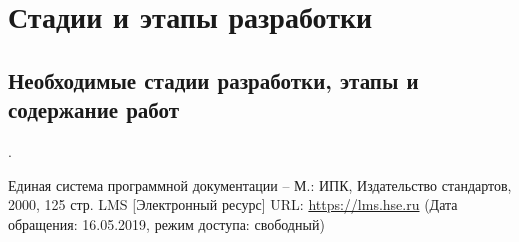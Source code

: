 \documentclass[a4paper,12pt,reqno]{article}
\begin{document}
						\newpage
	\section{Стадии и этапы разработки}
	
	\subsection{Необходимые стадии разработки, этапы и содержание работ}
	{\color{red}{TODO}}
	

						\newpage
	{\color{red}{TODO}}
						\newpage
	
	 \label{interface}
	{\color{red}{TODO}}.

						\newpage
	\begin{thebibliography}{3}
		Единая система программной документации – М.: ИПК, Издательство стандартов, 2000, 125 стр.
		LMS [Электронный ресурс] URL: 
		\url{https://lms.hse.ru} (Дата обращения: 16.05.2019, режим доступа: свободный)
		
	\end{thebibliography}

						\newpage
	\listRegistration
\end{document}
